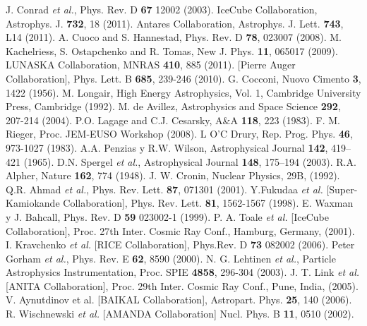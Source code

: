 \begin{thebibliography}{1}
 J. Conrad {\it et al.}, Phys. Rev. D \textbf{67} 12002 (2003).
 IceCube Collaboration, Astrophys. J. \textbf{732}, 18 (2011).
 Antares Collaboration, Astrophys. J. Lett. \textbf{743}, L14 (2011).
 A. Cuoco and S. Hannestad, Phys. Rev. D  \textbf{78}, 023007 (2008).
 M. Kachelriess, S. Ostapchenko and R. Tomas, New J. Phys. \textbf{11}, 065017 (2009).
 LUNASKA Collaboration, MNRAS \textbf{410}, 885 (2011).
 [Pierre Auger Collaboration], Phys. Lett. B \textbf{685}, 239-246 (2010).
 G. Cocconi, Nuovo Cimento \textbf{3}, 1422  (1956).
 M. Longair, High Energy Astrophysics, Vol. 1, Cambridge University Press, Cambridge (1992).
 M. de Avillez, Astrophysics and Space Science \textbf{292}, 207-214 (2004).
  P.O. Lagage and C.J. Cesarsky, A\&A \textbf{118}, 223 (1983).
 F. M. Rieger, Proc. JEM-EUSO Workshop (2008).
 L O'C Drury, Rep. Prog. Phys. \textbf{46}, 973-1027 (1983).
 A.A. Penzias y R.W. Wilson, Astrophysical Journal \textbf{142}, 419–421 (1965).
 D.N. Spergel {\it et al.}, Astrophysical Journal \textbf{148}, 175–194 (2003). 
 R.A. Alpher, Nature \textbf{162}, 774 (1948).  
 J. W. Cronin, Nuclear Physics, 29B, (1992).
 Q.R. Ahmad {\it et al.}, Phys. Rev. Lett. \textbf{87}, 071301 (2001).
 Y.Fukudaa {\it et al.} [Super-Kamiokande Collaboration], Phys. Rev. Lett. \textbf{81}, 1562-1567 (1998).
 E. Waxman y J. Bahcall, Phys. Rev. D \textbf{59} 023002-1 (1999).
 P. A. Toale {\it et al.} [IceCube Collaboration], Proc. 27th Inter. Cosmic Ray Conf., Hamburg, Germany, (2001).
 I. Kravchenko {\it et al.} [RICE Collaboration], Phys.Rev. D \textbf{73} 082002 (2006).
 Peter Gorham {\it et al.}, Phys. Rev. E \textbf{62}, 8590 (2000).
 N. G. Lehtinen {\it et al.}, Particle Astrophysics Instrumentation, Proc. SPIE \textbf{4858}, 296-304 (2003).
 J. T. Link {\it et al.} [ANITA Collaboration], Proc. 29th Inter. Cosmic Ray Conf., Pune, India, (2005).
 V. Aynutdinov et al. [BAIKAL Collaboration], Astropart. Phys. \textbf{25}, 140 (2006).
 R. Wischnewski {\it et al.} [AMANDA Collaboration] Nucl. Phys. B \textbf{11}, 0510 (2002).

\end{thebibliography}
